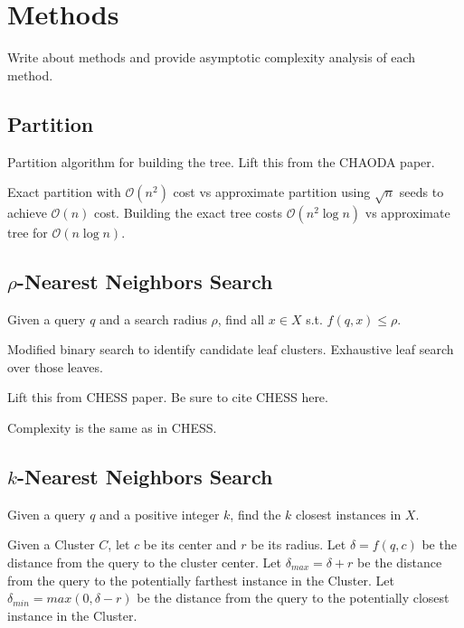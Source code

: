 \section{Methods}
\label{sec:methods}

Write about methods and provide asymptotic complexity analysis of each method.

\subsection{Partition}
\label{subsec:methods:partition}

Partition algorithm for building the tree.
Lift this from the CHAODA paper.

Exact partition with $\mathcal{O}(n^2)$ cost vs approximate partition using $\sqrt{n}$ seeds to achieve $\mathcal{O}(n)$ cost.
Building the exact tree costs $\mathcal{O}(n^2 \log n)$ vs approximate tree for $\mathcal{O}(n \log n)$.

\subsection{\texorpdfstring{$\rho$}{p}-Nearest Neighbors Search}
\label{subsec:methods:rnn-search}

Given a query $q$ and a search radius $\rho$, find all $x \in X$ s.t. $f(q, x) \leq \rho$.

Modified binary search to identify candidate leaf clusters.
Exhaustive leaf search over those leaves.

Lift this from CHESS paper. Be sure to cite CHESS here.

Complexity is the same as in CHESS.

\subsection{\texorpdfstring{$k$}{k}-Nearest Neighbors Search}
\label{subsec:methods:knn-search}

Given a query $q$ and a positive integer $k$, find the $k$ closest instances in $X$.

Given a Cluster $C$, let $c$ be its center and $r$ be its radius.
Let $\delta = f(q, c)$ be the distance from the query to the cluster center.
Let $\delta_{max} = \delta + r$ be the distance from the query to the potentially farthest instance in the Cluster.
Let $\delta_{min} = max(0, \delta - r)$ be the distance from the query to the potentially closest instance in the Cluster.

